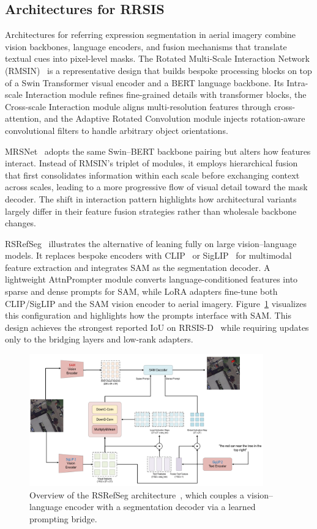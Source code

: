 \subsection{Architectures for RRSIS}

Architectures for referring expression segmentation in aerial imagery combine vision backbones, language encoders, and fusion mechanisms that translate textual cues into pixel-level masks. The Rotated Multi-Scale Interaction Network (RMSIN)~\cite{liu2024rotated} is a representative design that builds bespoke processing blocks on top of a Swin Transformer visual encoder and a BERT language backbone. Its Intra-scale Interaction module refines fine-grained details with transformer blocks, the Cross-scale Interaction module aligns multi-resolution features through cross-attention, and the Adaptive Rotated Convolution module injects rotation-aware convolutional filters to handle arbitrary object orientations.

MRSNet~\cite{yang2024large} adopts the same Swin–BERT backbone pairing but alters how features interact. Instead of RMSIN's triplet of modules, it employs hierarchical fusion that first consolidates information within each scale before exchanging context across scales, leading to a more progressive flow of visual detail toward the mask decoder. The shift in interaction pattern highlights how architectural variants largely differ in their feature fusion strategies rather than wholesale backbone changes.

RSRefSeg~\cite{chen2025rsrefseg} illustrates the alternative of leaning fully on large vision–language models. It replaces bespoke encoders with CLIP~\cite{clip} or SigLIP~\cite{siglip} for multimodal feature extraction and integrates SAM as the segmentation decoder. A lightweight AttnPrompter module converts language-conditioned features into sparse and dense prompts for SAM, while LoRA adapters fine-tune both CLIP/SigLIP and the SAM vision encoder to aerial imagery. Figure~\ref{fig:rsrefseg_arch} visualizes this configuration and highlights how the prompts interface with SAM. This design achieves the strongest reported IoU on RRSIS-D~\cite{liu2024rotated,chen2025rsrefseg} while requiring updates only to the bridging layers and low-rank adapters.
\begin{figure}[t]
\centering
\includegraphics[width=0.9\textwidth]{./images/rsrefseg.png}
\caption{Overview of the RSRefSeg architecture~\cite{chen2025rsrefseg}, which couples a vision–language encoder with a segmentation decoder via a learned prompting bridge.}
\label{fig:rsrefseg_arch}
\end{figure}

